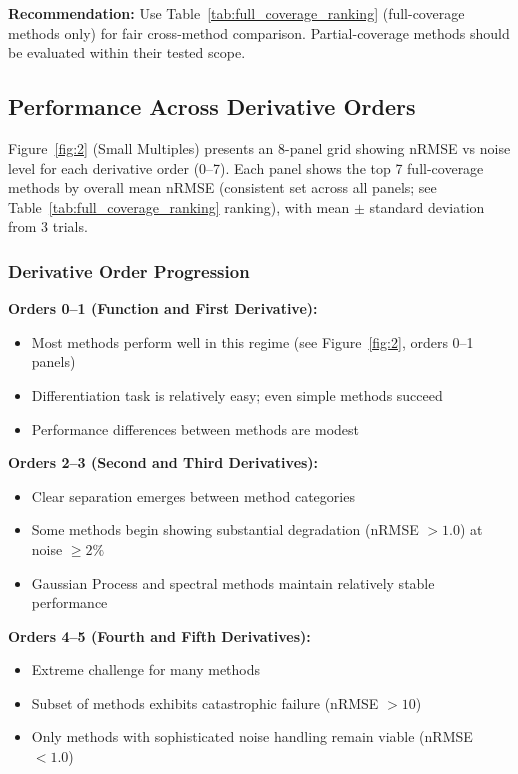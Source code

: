 \textbf{Recommendation:} Use Table~\ref{tab:full_coverage_ranking} (full-coverage methods only) for fair cross-method comparison. Partial-coverage methods should be evaluated within their tested scope.

\subsection{Performance Across Derivative Orders}
\label{sec:performance_by_order}

Figure~\ref{fig:2} (Small Multiples) presents an 8-panel grid showing nRMSE vs noise level for each derivative order (0--7). Each panel shows the top 7 full-coverage methods by overall mean nRMSE (consistent set across all panels; see Table~\ref{tab:full_coverage_ranking} ranking), with mean $\pm$ standard deviation from 3 trials.

\subsubsection{Derivative Order Progression}

\textbf{Orders 0--1 (Function and First Derivative):}
\begin{itemize}
    \item Most methods perform well in this regime (see Figure~\ref{fig:2}, orders 0--1 panels)
    \item Differentiation task is relatively easy; even simple methods succeed
    \item Performance differences between methods are modest
\end{itemize}

\textbf{Orders 2--3 (Second and Third Derivatives):}
\begin{itemize}
    \item Clear separation emerges between method categories
    \item Some methods begin showing substantial degradation (nRMSE $> 1.0$) at noise $\geq 2\%$
    \item Gaussian Process and spectral methods maintain relatively stable performance
\end{itemize}

\textbf{Orders 4--5 (Fourth and Fifth Derivatives):}
\begin{itemize}
    \item Extreme challenge for many methods
    \item Subset of methods exhibits catastrophic failure (nRMSE $> 10$)
    \item Only methods with sophisticated noise handling remain viable (nRMSE $< 1.0$)
\end{itemize}

